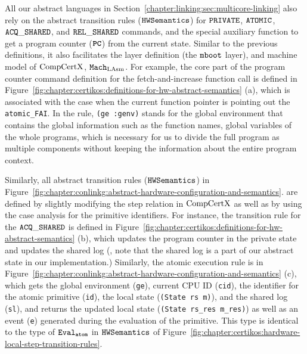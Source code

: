 All our abstract languages in Section~\ref{chapter:linking:sec:multicore-linking} 
also rely on the abstract transition rules (${\mathrm{\texttt{HWSemantics}}}$) for 
${{\mathrm{\texttt{PRIVATE}}}}$, ${{\mathrm{\texttt{ATOMIC}}}}$, ${{\mathrm{\texttt{ACQ}}}\_{\mathrm{\texttt{SHARED}}}}$, and ${{\mathrm{\texttt{REL}}}\_{\mathrm{\texttt{SHARED}}}}$ commands, and the special auxiliary function to get a program counter (${{\mathrm{\texttt{\textbf{PC}}}}}$) from the current state.
Similar to the previous definitions, 
it also facilitates the layer definition (the ${\mathrm{\texttt{mboot}}}$ layer), 
and machine model of $\mathrm{CompCertX}$, ${\mathrm{\texttt{Mach}}}_{\mathrm{LAsm}}$.
For example, the core part of the program counter command definition for the fetch-and-increase function call is defined in Figure~\ref{fig:chapter:certikos:definitions-for-hw-abstract-semantics} (a), which is associated with the case when the current function pointer is pointing out the \lstinline$atomic_FAI$. 
In the rule, \lstinline$(ge :genv)$ stands for the global environment that contains the 
global information such as the function names, global variables of the whole programs, which 
is necessary for us to divide the full program as multiple components without keeping the information 
about the entire program context.

Similarly, all abstract transition rules   (${\mathrm{\texttt{HWSemantics}}}$)  in  Figure~\ref{fig:chapter:conlinkg:abstract-hardware-configuration-and-semantics}.
are defined 
by slightly modifying the step relation in $\mathrm{CompCertX}$ as well as by using the case analysis for the primitive identifiers. 
For instance, the transition rule for the ${{\mathrm{\texttt{ACQ}}}\_{\mathrm{\texttt{SHARED}}}}$ is defined in Figure~\ref{fig:chapter:certikos:definitions-for-hw-abstract-semantics} (b), which updates the program counter in the private state
and  updates the shared log (\ie, note that the shared log is a part of our abstract state in our implementation.)
Similarly, the atomic execution rule is in Figure~\ref{fig:chapter:conlinkg:abstract-hardware-configuration-and-semantics} (c),
which gets the global environment (\lstinline$ge$), current CPU ID (\lstinline$cid$), the identifier for the atomic primitive
(\lstinline$id$), the local state (\lstinline$(State rs m)$),
and the shared log (\lstinline$sl$), and returns the updated local state (\lstinline$(State rs_res m_res)$) as well as an event (\lstinline$e$) generated during the evaluation of the primitive.
This type is identical to the type of ${{\mathrm{\texttt{Eval}}}_{{\mathrm{\texttt{atom}}}}}$ in ${\mathrm{\texttt{HWSemantics}}}$ of Figure~\ref{fig:chapter:certikos:hardware-local-step-transition-rules}.


